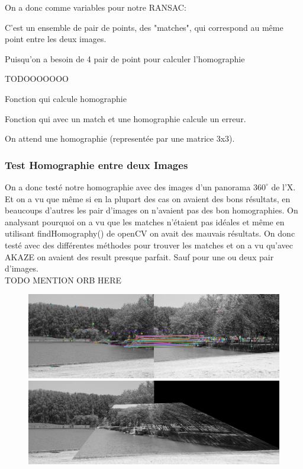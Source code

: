 \documentclass[11pt]{article}
\begin{document}
On a donc comme variables pour notre RANSAC:
\begin{description}[labelindent=16pt,style=multiline,leftmargin=7cm, noitemsep]
	\item[Données:] C’est un ensemble de pair de points, des "matches",  qui correspond au même point entre les deux images.
	\item[Nombre minimum de donnée:] Puisqu’on a besoin de 4 pair de point pour calculer l’homographie
	\item[Error threshold:] TODOOOOOOO
	\item[CalculateParametres:] Fonction qui calcule homographie
	\item[CalculateError:] Fonction qui avec un match et une homographie calcule un erreur.
	\item[bestFittingParameters:] On attend une homographie (representée par une matrice 3x3).
\end{description}

\subsubsection{Test Homographie entre deux Images}

On a donc testé notre homographie avec des images d’un panorama $360^{\circ}$ de l’X. Et on a vu que même si en la plupart des cas on avaient des bons résultats, en beaucoups d’autres les pair d’images on n’avaient pas des bon homographies. On analysant pourquoi on a vu que les matches n’étaient pas idéales et même en utilisant findHomography() de openCV on avait des mauvais résultats. On donc testé avec des différentes méthodes pour trouver les matches et on a vu qu’avec AKAZE on avaient des result presque parfait. Sauf pour une ou deux pair d’images. \\

TODO MENTION ORB HERE

\begin{figure}[H]
\centering
\includegraphics[width=.8\textwidth]{../resources/matchers/orb.jpg}
\includegraphics[width=.8\textwidth]{../resources/matchers/orb_pano.jpg}
\end{figure}
\end{document}
